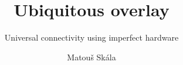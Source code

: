 \documentclass[whitelogo]{tudelft-report}
\begin{document}
\frontmatter


\title[tudelft-white]{Ubiquitous overlay}
\subtitle[tudelft-black]{Universal connectivity using imperfect hardware}
\author[tudelft-white]{Matouš Skála}


%
\makecover[split]






\tableofcontents

\mainmatter



%

%

%

%

\appendix

%


\end{document}
